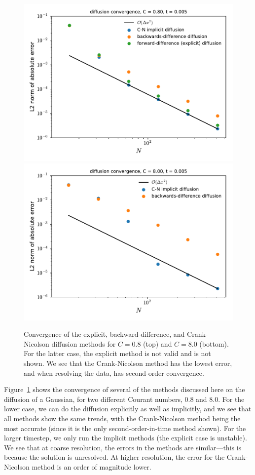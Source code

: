 \begin{figure}
\centering
\includegraphics[width=0.75\linewidth]{diffimplicit-converge-0_8} \\
\includegraphics[width=0.75\linewidth]{diffimplicit-converge-8_0} 
\caption[Convergence of diffusion methods]
{\label{fig:diff:convergence} Convergence of the explicit, backward-difference,
and Crank-Nicolson diffusion methods for $C = 0.8$ (top) and $C = 8.0$ (bottom).
For the latter case, the explicit method is not valid and is not shown.
We see that the Crank-Nicolson method has the lowest error, and when resolving
the data, has second-order convergence.\\
}
\end{figure}


Figure~\ref{fig:diff:convergence} shows the convergence of several of
the methods discussed here on the diffusion of a Gaussian, for two
different Courant numbers, 0.8 and 8.0.  For the lower case, we can do
the diffusion explicitly as well as implicitly, and we see that all
methods show the same trends, with the Crank-Nicolson method being the
most accurate (since it is the only second-order-in-time method
shown).  For the larger timestep, we only run the implicit methods
(the explicit case is unstable).  We see that at coarse resolution,
the errors in the methods are similar---this is because the solution
is unresolved.  At higher resolution, the error for the Crank-Nicolson
method is an order of magnitude lower.



